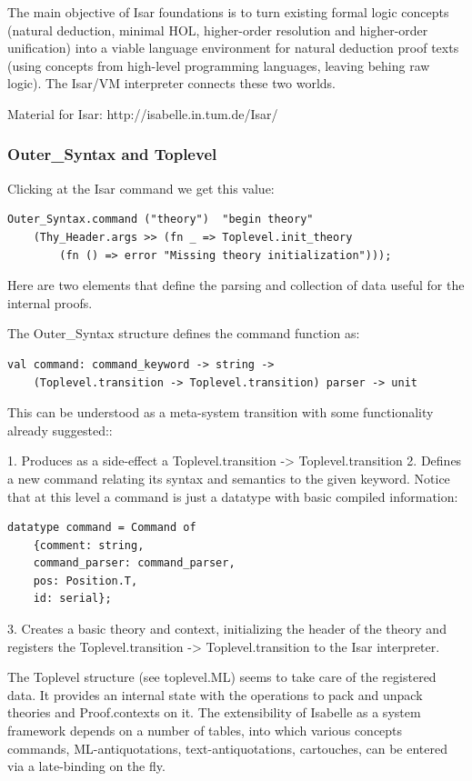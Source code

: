 The main objective of Isar foundations is to turn existing formal logic concepts (natural deduction, minimal HOL, higher-order resolution and higher-order unification) into  a  viable  language  environment  for  natural  deduction  proof  texts (using concepts from high-level programming languages, leaving behing raw logic). The Isar/VM interpreter connects these two worlds.

Material for Isar: http://isabelle.in.tum.de/Isar/

\subsubsection{Outer\_Syntax and Toplevel}

Clicking at the Isar command we get this value:

\begin{lstlisting}
Outer_Syntax.command ("theory")  "begin theory"
	(Thy_Header.args >> (fn _ => Toplevel.init_theory 
		(fn () => error "Missing theory initialization")));
\end{lstlisting}

Here are two elements that define the parsing and collection of data useful for the internal proofs. 

The Outer\_Syntax structure defines the command function as:

\begin{lstlisting}
val command: command_keyword -> string ->
	(Toplevel.transition -> Toplevel.transition) parser -> unit
\end{lstlisting}

This can be understood as a meta-system transition with some functionality already suggested::

1. Produces as a side-effect a Toplevel.transition -> Toplevel.transition
2. Defines a new command relating its syntax and semantics to the given keyword. Notice that at this level a command is just a datatype with basic compiled information:

\begin{lstlisting}
datatype command = Command of
	{comment: string,
	command_parser: command_parser,
	pos: Position.T,
	id: serial};
\end{lstlisting}

3. Creates a basic theory and context, initializing the header of the theory and registers the Toplevel.transition -> Toplevel.transition to the Isar interpreter.
 
The Toplevel structure (see toplevel.ML) seems to take care of the registered data. It provides an internal state with the operations to pack and unpack theories and Proof.contexts on it. The extensibility of Isabelle as a system framework depends on a number of tables, into
which various concepts commands, ML-antiquotations, text-antiquotations, cartouches, can be entered via a late-binding on the fly.

